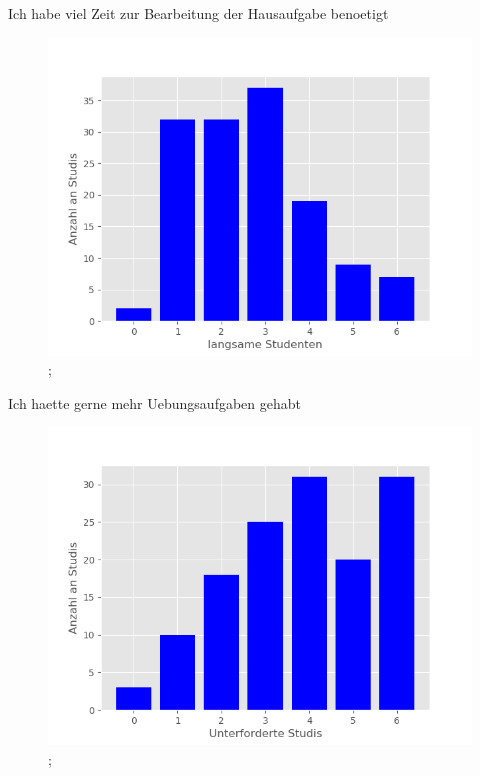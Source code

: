 \documentclass[10pt]{beamer}
\begin{document}
\begin{frame}[fragile]{Ich habe viel Zeit zur Bearbeitung der Hausaufgabe benoetigt} 
 \begin{figure}
 \includegraphics[width= 0.9\linewidth]{./PDFcreater/Plots/Ich+habe+viel+Zeit+zur+Bearbeitung+der+Hausaufgabe+benoetigt.png};
 \end{figure}
 \end{frame}
\begin{frame}[fragile]{Ich haette gerne mehr Uebungsaufgaben gehabt} 
 \begin{figure}
 \includegraphics[width= 0.9\linewidth]{./PDFcreater/Plots/Ich+haette+gerne+mehr+Uebungsaufgaben+gehabt.png};
 \end{figure}
 \end{frame}
\end{document}
